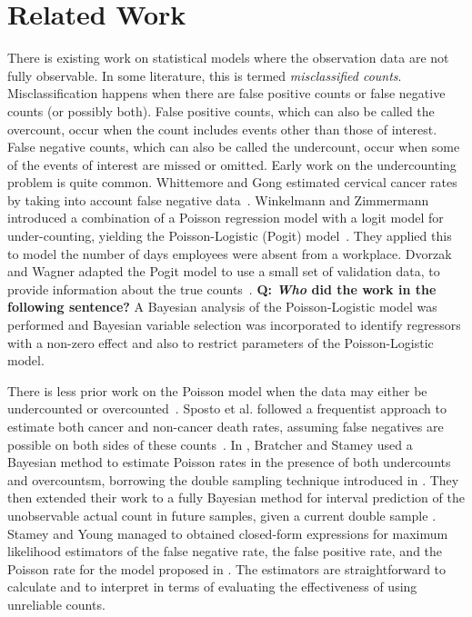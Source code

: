 
\section{Related Work}
\label{sec:related}

There is existing work on statistical models where the observation data are not fully observable. In some literature, this is termed \emph{misclassified counts}. Misclassification happens when there are false positive counts or false negative counts (or possibly both). False positive counts, which can also be called the overcount, occur when the count includes events other than those of interest. False negative counts, which can also be called the undercount, occur when some of the events of interest are missed or omitted. Early work on the undercounting problem is quite common. Whittemore and Gong estimated cervical cancer rates by taking into account false negative data~\cite{whittemore1991}. Winkelmann and Zimmermann introduced a combination of a Poisson regression model with a logit model for under-counting, yielding the Poisson-Logistic (Pogit) model~\cite{winkelmann1993poisson}. They applied this to model the number of days employees were absent from a workplace. Dvorzak and Wagner adapted the Pogit model to use a small set of validation data, to provide information about the true counts~\cite{dvorzak2016}. \textbf{Q: \emph{Who} did the work in the following sentence?} A Bayesian analysis of the Poisson-Logistic model was performed and Bayesian variable selection was incorporated to identify regressors with a non-zero effect and also to restrict parameters of the Poisson-Logistic model.

There is less prior work on the Poisson model when the data may either be undercounted or overcounted~\cite{sposto1992, bratcher2002, bratcher2004, stamey2005}. Sposto et al. followed a frequentist approach to estimate both cancer and non-cancer death rates, assuming false negatives are possible on both sides of these counts~\cite{sposto1992}. In \cite{bratcher2002}, Bratcher and Stamey used a Bayesian method to estimate Poisson rates in the presence of both undercounts and overcountsm, borrowing the double sampling technique introduced in \cite{Tenenbein1970}. They then extended their work to a fully Bayesian method for interval prediction of the unobservable actual count in future samples, given a current double sample \cite{bratcher2004}. Stamey and Young \cite{stamey2005} managed to obtained closed-form expressions for maximum likelihood estimators of the false negative rate, the false positive rate, and the Poisson rate for the model proposed in \cite{bratcher2002}. The estimators are straightforward to calculate and to interpret in terms of evaluating the effectiveness of using unreliable counts.

